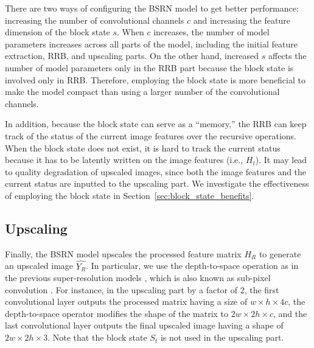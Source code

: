 \documentclass[runningheads]{llncs}
\begin{document}
There are two ways of configuring the BSRN model to get better performance: increasing the number of convolutional channels $c$ and increasing the feature dimension of the block state $s$.
When $c$ increases, the number of model parameters increases across all parts of the model, including the initial feature extraction, RRB, and upscaling parts.
On the other hand, increased $s$ affects the number of model parameters only in the RRB part because the block state is involved only in RRB.
Therefore, employing the block state is more beneficial to make the model compact than using a larger number of the convolutional channels.

In addition, because the block state can serve as a ``memory,'' the RRB can keep track of the status of the current image features over the recursive operations.
When the block state does not exist, it is hard to track the current status because it has to be latently written on the image features (i.e., ${H}_{t}$).
It may lead to quality degradation of upscaled images, since both the image features and the current status are inputted to the upscaling part.
We investigate the effectiveness of employing the block state in Section~\ref{sec:block_state_benefits}.


\subsection{Upscaling}

Finally, the BSRN model upscales the processed feature matrix ${H}_{R}$ to generate an upscaled image $\widehat{{Y}_{R}}$.
In particular, we use the depth-to-space operation as in the previous super-resolution models \cite{ahn2018fast,choi2017deep}, which is also known as sub-pixel convolution \cite{shi2016real}.
For instance, in the upscaling part by a factor of 2, the first convolutional layer outputs the processed matrix having a size of ${w}\times{h}\times{4c}$, the depth-to-space operator modifies the shape of the matrix to ${2w}\times{2h}\times{c}$, and the last convolutional layer outputs the final upscaled image having a shape of ${2w}\times{2h}\times{3}$.
Note that the block state ${S}_{t}$ is not used in the upscaling part.
\end{document}
